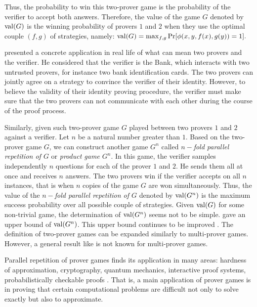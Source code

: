 Thus, the probability to win  this two-prover game is the probability of the verifier to accept both answers.  Therefore, the value of the game $G$ denoted by $\mathrm{val} (G)$ is the winning probability of provers $1$ and $2$ when they use the optimal couple $(f,g)$ of strategies, namely: $\mathrm{val} (G)= \max_{f,g} \mathrm{Pr}[\phi (x,y,f(x),g(y))=1].$ 

 \cite*{ben1990efficient} presented a concrete application in real life of what can mean  two provers and the verifier. He considered that the verifier is the Bank, which interacts with two untrusted provers, for instance two bank identification cards. The two provers can jointly agree on a strategy to convince the verifier of their identity. However, to believe the validity of their identity proving procedure, the verifier must make sure that the two provers can not communicate with each other during the course of the proof process.

Similarly, given such two-prover game $G$ played between two provers $1$ and $2$ against a verifier. Let $n$ be a natural number greater than $1.$ Based on the two-prover game $G$,
we can construct another game $G^n$ called $n-$\textit{fold parallel repetition of $G$} or \textit{product game $G^n$}. In this game, the verifier samples independently $n$ questions for each of the prover $1$ and $2.$ He sends them all at once and receives $n$ answers. The two provers win if the verifier accepts on all $n$ instances, that is  when $n$ copies of the game $G$ are won simultaneously.
Thus, the value of the $n-$\textit{fold parallel repetition of $G$} denoted by $\mathrm{val} (G^n)$ is the maximum success probability over all possible couple of strategies. Given $\mathrm{val} (G)$ for some non-trivial game, the determination of $\mathrm{val} (G^n)$ seems not to be  simple. \cite{raz1998parallel} gave an upper bound of $\mathrm{val} (G^n)$.
This upper bound  continues to be improved 
\citep*{holenstein2007parallel, raz2012strong, dinur2014analytical, dinur2016multiplayer}.
The definition of two-prover games can be expanded similarly to multi-prover games. However, a general result like \cite{raz1998parallel} is not known for multi-prover games.

Parallel repetition of prover games finds its application in many areas: hardness of approximation, cryptography, quantum mechanics, interactive proof systems, probabilistically checkable proofs  \cite*{tamaki2015parallel, dinur2016multiplayer}. 
 That is, a main application of prover games is in proving that certain computational problems are difficult not only to solve exactly but also to approximate.

